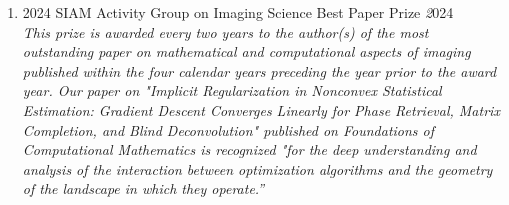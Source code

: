 \documentclass[a4paper, 10pt]{article}
\newenvironment{changemargin}[2]{%
  \begin{list}{}{%
    \setlength{\topsep}{0pt}%
    \setlength{\leftmargin}{#1}%
    \setlength{\rightmargin}{#2}%
    \setlength{\listparindent}{\parindent}%
    \setlength{\itemindent}{\parindent}%
    \setlength{\parsep}{\parskip}%
  }%
  \item[]}{\end{list}
}
\newenvironment{body} {
	\vspace*{-16pt}
	\begin{changemargin}{-0.3in}{-0.5in}
  }	
	{\end{changemargin}
}
\begin{document}
\begin{body}
    \vspace{18pt}
    \begin{enumerate}
    \item 2024 SIAM Activity Group on Imaging Science Best Paper Prize \hfill{} \emph 2024 \\
    	{\em This prize is awarded every two years to the author(s) of the most outstanding paper on mathematical and computational aspects of imaging published within the four calendar years preceding the year prior to the award year. Our paper on "Implicit Regularization in Nonconvex Statistical Estimation: Gradient Descent Converges Linearly for Phase Retrieval, Matrix Completion, and Blind Deconvolution" published on Foundations of Computational Mathematics is recognized "for the deep understanding and analysis of the interaction between optimization algorithms and the geometry of the landscape in which they operate.”} \\
    \smallskip


\end{enumerate}
\end{body}
\end{document}
